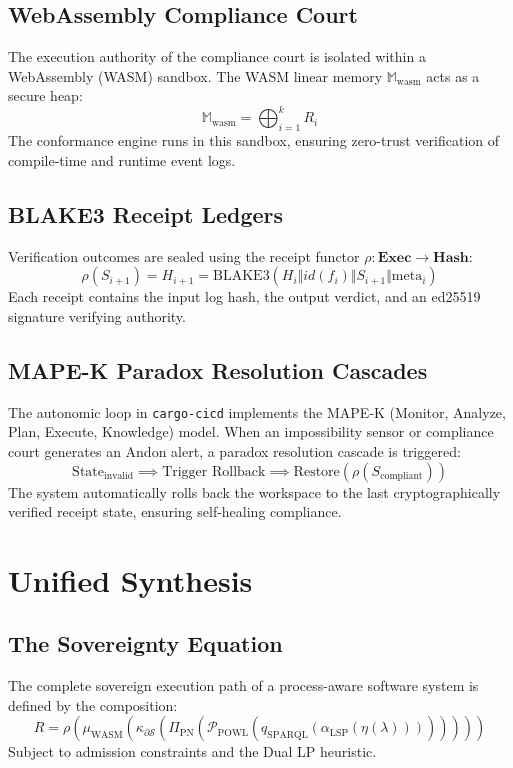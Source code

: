 \documentclass[11pt,a4paper,oneside]{book}
\begin{document}
\section{WebAssembly Compliance Court}
The execution authority of the compliance court is isolated within a WebAssembly (WASM) sandbox. The WASM linear memory $\mathbb{M}_{\mathrm{wasm}}$ acts as a secure heap:
\[
\mathbb{M}_{\mathrm{wasm}} = \bigoplus_{i=1}^k R_i
\]
The conformance engine runs in this sandbox, ensuring zero-trust verification of compile-time and runtime event logs.

\section{BLAKE3 Receipt Ledgers}
Verification outcomes are sealed using the receipt functor $\rho: \mathbf{Exec} \to \mathbf{Hash}$:
\[
\rho(S_{i+1}) = H_{i+1} = \mathrm{BLAKE3}( H_i \Vert id(f_i) \Vert S_{i+1} \Vert \mathrm{meta}_i )
\]
Each receipt contains the input log hash, the output verdict, and an ed25519 signature verifying authority.

\section{MAPE-K Paradox Resolution Cascades}
The autonomic loop in \texttt{cargo-cicd} implements the MAPE-K (Monitor, Analyze, Plan, Execute, Knowledge) model. When an impossibility sensor or compliance court generates an Andon alert, a paradox resolution cascade is triggered:
\[
\mathrm{State}_{\mathrm{invalid}} \implies \text{Trigger Rollback} \implies \mathrm{Restore}(\rho(S_{\mathrm{compliant}}))
\]
The system automatically rolls back the workspace to the last cryptographically verified receipt state, ensuring self-healing compliance.

\chapter{Unified Synthesis}

\section{The Sovereignty Equation}
The complete sovereign execution path of a process-aware software system is defined by the composition:
\[
\boxed{ R = \rho \left( \mu_{\mathrm{WASM}} \left( \kappa_{\partial \mathcal{S}} \left( \Pi_{\mathrm{PN}} \left( \mathcal{P}_{\mathrm{POWL}} \left( q_{\mathrm{SPARQL}} \left( \alpha_{\mathrm{LSP}} \left( \eta(\lambda) \right) \right) \right) \right) \right) \right) \right) }
\]
Subject to admission constraints and the Dual LP heuristic.
\end{document}
